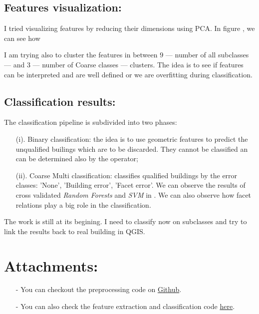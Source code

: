 \documentclass[a4paper, 11pt]{article}
\begin{document}
	\subsection{Features visualization:}

	I tried visualizing features by reducing their dimensions using PCA. In figure , we can see how

	I am trying also to cluster the features in between $9$ --- number of all subclasses --- and $3$ --- number of Coarse classes --- clusters. The idea is to see if features can be interpreted and are well defined or we are overfitting during classification.

	\subsection{Classification results:}

	The classification pipeline is subdivided into two phases:

	\begin{itemize}
		\item[(i).] Binary classification: the idea is to use geometric features to predict the unqualified builings which are to be discarded. They cannot be classified an can be determined also by the operator;
		\item[(ii).] Coarse Multi classification: classifies qualified buildings by the error classes: 'None', 'Building error', 'Facet error'. We can observe the results of cross validated \textit{Random Forests} and \textit{SVM} in . We can also observe how facet relations play a big role in the classification.
	\end{itemize}

	The work is still at its begining. I need to classify now on subclasses and try to link the results back to real building in QGIS.

	\section*{Attachments:}
	\begin{itemize}
		\item[-] You can checkout the preprocessing code on
		\href{https://github.com/ethiy/proj.city}{Github}.
		\item[-] You can also check the feature extraction and classification code
		\href{https://github.com/ethiy/qualcity}{here}.
	\end{itemize}
\end{document}
